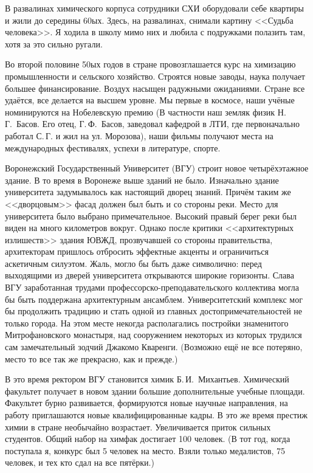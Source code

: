 В развалинах химического корпуса сотрудники СХИ оборудовали себе квартиры и жили до середины 60ых. Здесь, на развалинах, снимали картину <<Судьба человека>>. Я ходила в школу мимо них и любила с подружками полазить там, хотя за это сильно ругали.

Во второй половине 50ых годов в стране провозглашается курс на химизацию промышленности и сельского хозяйство. Строятся новые заводы, наука получает большее финансирование. Воздух насыщен радужными ожиданиями. Стране все удаётся, все делается на высшем уровне. Мы первые в космосе, наши учёные номинируются на Нобелевскую премию (В частности наш земляк физик Н.\,Г.~Басов. Его отец, Г.\,Ф.~Басов, заведовал кафедрой в ЛТИ, где первоначально работал С.\,Г. и жил на ул. Морозова), наши фильмы получают места на международных фестивалях, успехи в литературе, спорте.

Воронежский Государственный Университет (ВГУ)
\linebreak
строит новое четырёхэтажное здание.
В то время в Воронеже выше зданий не было. Изначально здание университета задумывалось как настоящий дворец знаний. Причём таким же <<дворцовым>> фасад должен был быть и со стороны реки. Место для университета было выбрано примечательное. Высокий правый берег реки был виден на много километров вокруг. Однако после критики <<архитектурных излишеств>> здания ЮВЖД, прозвучавшей со стороны правительства, архитекторам пришлось отбросить эффектные акценты и ограничиться аскетичным силуэтом. Жаль, могло бы быть даже символично: перед выходящими из дверей университета открываются широкие горизонты. Слава ВГУ заработанная трудами профессорско-преподавательского коллектива могла бы быть поддержана архитектурным ансамблем. Университетский комплекс мог бы продолжить традицию и стать одной из главных достопримечательностей не только города. На этом месте некогда располагались постройки знаменитого Митрофановского монастыря, над сооружением некоторых из которых трудился сам замечательный зодчий Джакомо Кваренги. (Возможно ещё не все потеряно, место то все так же прекрасно, как и прежде.)

В это время ректором ВГУ становится химик Б.\,И.~Михантьев.
Химический факультет получает в новом здании большие дополнительные учебные площади. Факультет бурно развивается, формируются новые научные направления, на работу приглашаются новые квалифицированные кадры. В это же время престиж химии в стране необычайно возрастает. Увеличивается приток сильных студентов. Общий набор на химфак достигает 100 человек. (В тот год, когда поступала я, конкурс был 5 человек на место. Взяли только медалистов, 75 человек, и тех кто сдал на все пятёрки.)

